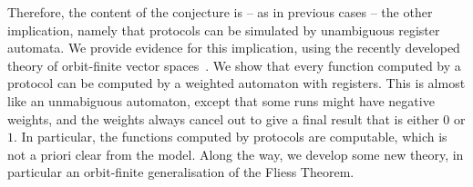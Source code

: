 Therefore,  the content of the conjecture is -- as in previous cases --  the other implication, namely that protocols can be simulated by unambiguous register automata. We provide evidence for this implication, using the recently developed theory of orbit-finite vector spaces~\cite{orbitFiniteVectorTheoretics}. We show that every function computed by a protocol can be computed by a weighted automaton with registers. This is almost like an unmabiguous automaton, except that some runs might have negative weights, and the weights always cancel out to give a final result that is either $0$ or $1$. In particular, the functions computed by protocols are computable, which is not a priori clear from the model. Along the way, we develop some new theory, in particular an orbit-finite generalisation of the Fliess Theorem. 

